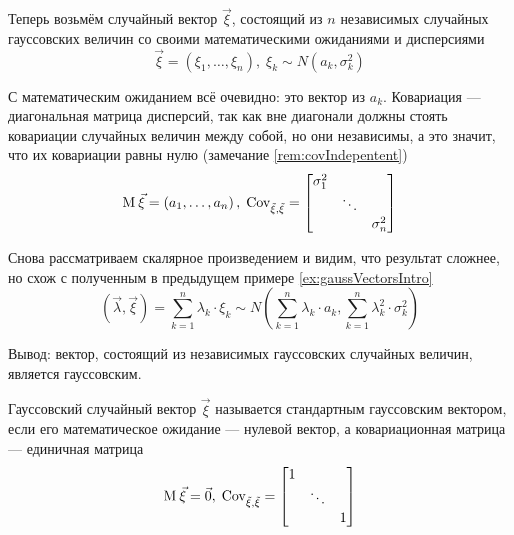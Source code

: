 \begin{example}\label{example:gaussianVector:gaussianElements}
    Теперь возьмём случайный вектор $\vec{\xi}$, состоящий из $n$ независимых
    случайных гауссовских величин со своими математическими ожиданиями
    и дисперсиями
    $$\vec{\xi} = \left( \xi_1, \dots, \xi_n \right),\;
        \xi_k \sim N\left( a_k, \sigma_k^2 \right)$$

    С математическим ожиданием всё очевидно: это вектор
    из $a_k$. Ковариация --- диагональная матрица дисперсий, так как вне
    диагонали должны стоять ковариации случайных величин между собой,
    но они независимы, а это значит, что их ковариации равны нулю
    (замечание \ref{rem:covIndepentent})
    $$\operatorname{M}_{} \vec{\xi} = \left( a_1, \dots, a_n \right),\;
        \operatorname{Cov^{}_{\vec{\xi}, \vec{\xi}}} =
        \begin{bmatrix}
            \sigma_1^2 & & \\
            & \ddots & \\
            & & \sigma_n^2
        \end{bmatrix}$$

    Снова рассматриваем скалярное произведением и видим, что результат сложнее,
    но схож с полученным в предыдущем примере \ref{ex:gaussVectorsIntro}
    $$\left( \vec{\lambda}, \vec{\xi} \right)
        = \sum_{k=1}^{n} \lambda_k \cdot \xi_k \sim
        N\left( \sum_{k=1}^{n} \lambda_k \cdot a_k,
        \sum_{k=1}^{n} \lambda_k^2 \cdot \sigma_k^2 \right)$$

    Вывод: вектор, состоящий из независимых гауссовских случайных величин,
    является гауссовским.
\end{example}

\begin{definition}
    Гауссовский случайный вектор $\vec{\xi}$ называется стандартным гауссовским
    вектором, если его математическое ожидание --- нулевой вектор,
    а ковариационная матрица --- единичная матрица
    $$\operatorname{M}_{} \vec{\xi} = \vec{0},\;
        \operatorname{Cov^{}_{\vec{\xi}, \vec{\xi}}} =
        \begin{bmatrix}
            1 & & \\
            & \ddots & \\
            & & 1
        \end{bmatrix}$$
\end{definition}

